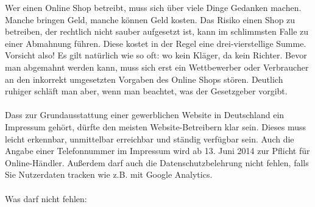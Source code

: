 \documentclass[a4paper]{article}
\begin{document}
Wer einen Online Shop betreibt, muss sich über viele Dinge Gedanken machen. Manche bringen Geld, manche können Geld kosten. Das Risiko einen Shop zu betreiben, der rechtlich nicht sauber aufgesetzt ist, kann im schlimmsten Falle zu einer Abmahnung führen. Diese kostet in der Regel eine drei-vierstellige Summe. Vorsicht also! Es gilt natürlich wie so oft: wo kein Kläger, da kein Richter. Bevor man abgemahnt werden kann, muss sich erst ein Wettbewerber oder Verbraucher an den inkorrekt umgesetzten Vorgaben des Online Shops stören. Deutlich ruhiger schläft man aber, wenn man beachtet, was der Gesetzgeber vorgibt.\\\\
Dass zur Grundausstattung einer gewerblichen Website in Deutschland ein Impressum gehört, dürfte den meisten Website-Betreibern klar sein. Dieses muss leicht erkennbar, unmittelbar erreichbar und ständig verfügbar sein. Auch die Angabe einer Telefonnummer im Impressum wird ab 13. Juni 2014 zur Pflicht für Online-Händler. Außerdem darf auch die Datenschutzbelehrung nicht fehlen, falls Sie Nutzerdaten tracken wie z.B. mit Google Analytics.\\\\
Was darf nicht fehlen:
\end{document}

